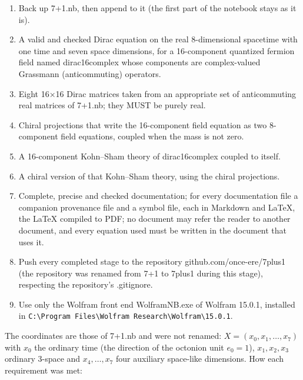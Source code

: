 \documentclass[10pt,a4paper]{article}
\begin{document}
\begin{enumerate}
\item Back up 7+1.nb, then append to it (the first part of the notebook stays as it is).
\item A valid and checked Dirac equation on the real 8-dimensional spacetime with one time and seven space dimensions, for a 16-component quantized fermion field named dirac16complex whose components are complex-valued Grassmann (anticommuting) operators.
\item Eight 16×16 Dirac matrices taken from an appropriate set of anticommuting real matrices of 7+1.nb; they MUST be purely real.
\item Chiral projections that write the 16-component field equation as two 8-component field equations, coupled when the mass is not zero.
\item A 16-component Kohn–Sham theory of dirac16complex coupled to itself.
\item A chiral version of that Kohn–Sham theory, using the chiral projections.
\item Complete, precise and checked documentation; for every documentation file a companion provenance file and a symbol file, each in Markdown and LaTeX, the LaTeX compiled to PDF; no document may refer the reader to another document, and every equation used must be written in the document that uses it.
\item Push every completed stage to the repository github.com/once-ere/7plus1 (the repository was renamed from 7+1 to 7plus1 during this stage), respecting the repository’s .gitignore.
\item Use only the Wolfram front end WolframNB.exe of Wolfram 15.0.1, installed in \texttt{C:\textbackslash{}\allowbreak{}Program Files\textbackslash{}\allowbreak{}Wolfram Research\textbackslash{}\allowbreak{}Wolfram\textbackslash{}\allowbreak{}15.0.1}.
\end{enumerate}
The coordinates are those of 7+1.nb and were not renamed: $X=(x_0,x_1,\dots,x_7)$ with $x_0$ the ordinary time (the direction of the octonion unit $e_0=1$), $x_1,x_2,x_3$ ordinary 3-space and $x_4,\dots,x_7$ four auxiliary space-like dimensions. How each requirement was met:
\end{document}
